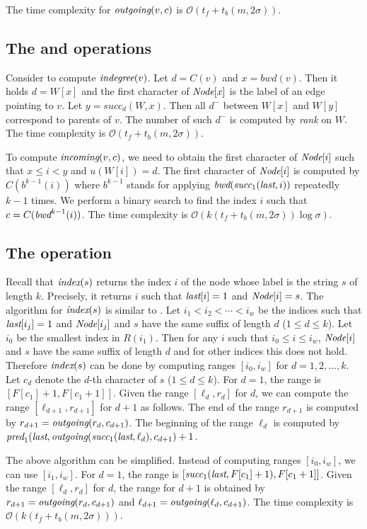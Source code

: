 \documentclass{llncs}
\newcommand{\Order}{\mathcal{O}}
\def\rank{\textit{rank}}
\def\pred{\textit{pred}}
\def\succ{\textit{succ}}
\begin{document}
The time complexity for ${\textit{outgoing}}(v,c)$ is 
$\Order(t_f + t_b(m, 2\sigma))$.

\subsection{The {\pdeg} and {\parent} operations}
Consider to compute ${\textit{indegree}}(v)$.
Let $d = C(v)$ and $x = bwd(v)$.  Then it holds $d = W[x]$ and the first character
of ${\textit{Node}}[x]$ is the label of an edge pointing to $v$.
Let $y = {\succ}_d(W, x)$.  Then all $d^-$ between $W[x]$ and $W[y]$ correspond
to parents of $v$.  The number of such $d^-$ is computed by {\rank} on $W$.
The time complexity is $\Order(t_f + t_b(m,2\sigma))$.

To compute ${\textit{incoming}}(v,c)$, we need to obtain the first character of ${\textit{Node}}[i]$
such that $x \le i < y$ and $u(W[i]) = d$.  The first character of ${\textit{Node}}[i]$
is computed by $C(b^{k-1}(i))$ where $b^{k-1}$ stands for applying
${\bwd}({\succ}_1({\last},i))$ repeatedly $k-1$ times.  
We perform a binary search to
find the index $i$ such that $c = C({\textit{bwd}}^{k-1}(i))$.
The time complexity is 
$\Order(k(t_f + t_b(m,2\sigma))\log\sigma)$.

\subsection{The {\search} operation}
Recall that ${\textit{index}}(s)$ returns the index $i$ of the node whose label 
is the string $s$ of length $k$.
Precisely, it returns $i$ such that ${\textit{last}}[i] = 1$ and ${\textit{Node}}[i] = s$.
The algorithm for ${\textit{index}}(s)$ is similar to \cite{FerMan05}.
Let $i_1 < i_2 < \cdots < i_w$ be the indices such that
${\textit{last}}[i_j] = 1$ and ${\textit{Node}}[i_j]$ and $s$ have the same suffix of length $d$ ($1 \le d \le k$).
Let $i_0$ be the smallest index in $R(i_1)$.
Then for any $i$ such that $i_0 \le i \le i_w$, ${\textit{Node}}[i]$ and $s$ have the same suffix of length $d$
and for other indices this does not hold.
Therefore ${\textit{index}}(s)$ can be done by computing 
ranges $[i_0, i_w]$ for $d = 1,2,\ldots,k$.
Let $c_d$ denote the $d$-th character of $s$ ($1 \le d \le k$).
For $d=1$, the range is $[F[c_1]+1, F[c_1+1]]$.
Given the range $[\ell_d, r_d]$ for $d$,  we can compute the range $[\ell_{d+1}, r_{d+1}]$ for $d+1$
as follows.  The end of the range $r_{d+1}$ is computed by $r_{d+1} = {\textit{outgoing}}(r_d, c_{d+1})$.
The beginning of the range $\ell_d$ is computed by ${\pred}_1({\last},{\child}({\succ}_1({\last}, \ell_d), c_{d+1})+1$.

The above algorithm can be simplified.  Instead of computing ranges $[i_0, i_w]$,
we can use $[i_1, i_w]$.  For $d=1$, the range is $[{\succ}_1({\last},F[c_1]+1), F[c_1+1]]$.
Given the range $[\ell_d, r_d]$ for $d$, the range for $d+1$ is obtained by
$r_{d+1} = {\textit{outgoing}}(r_d, c_{d+1})$ and $\ell_{d+1} = {\textit{outgoing}}(\ell_d, c_{d+1})$.
The time complexity is $\Order(k(t_f + t_b(m,2\sigma)))$.
\end{document}
